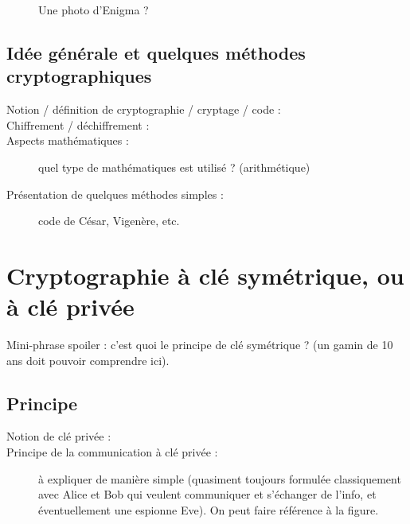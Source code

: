 \documentclass[a4paper,11pt]{article}
\begin{document}
\begin{figure}[!h]
\begin{center}
  \caption{Une photo d'Enigma ?}
  \label{etiquette_de_la_figure_pour_y_faire_reference_plus_tard}
\end{center}
\end{figure}

\subsection{Idée générale et quelques méthodes cryptographiques}

\begin{description}
\item [Notion / définition de cryptographie / cryptage / code :]

\item [Chiffrement / déchiffrement : ]

\item [Aspects mathématiques :] quel type de mathématiques est utilisé ? (arithmétique)

\item [Présentation de quelques méthodes simples : ] code de César, Vigenère, etc.

\end{description}

\section{Cryptographie à clé symétrique, ou à clé privée}

Mini-phrase spoiler : c'est quoi le principe de clé symétrique ? (un gamin de 10 ans doit pouvoir comprendre ici).

\subsection{Principe}

\begin{description}
\item [Notion de clé privée : ]

\item [Principe de la communication à clé privée : ] à expliquer de manière simple (quasiment toujours formulée classiquement avec Alice et Bob qui veulent communiquer et s'échanger de l'info, et éventuellement une espionne Eve). On peut faire référence à la figure.

\end{description}
\end{document}
